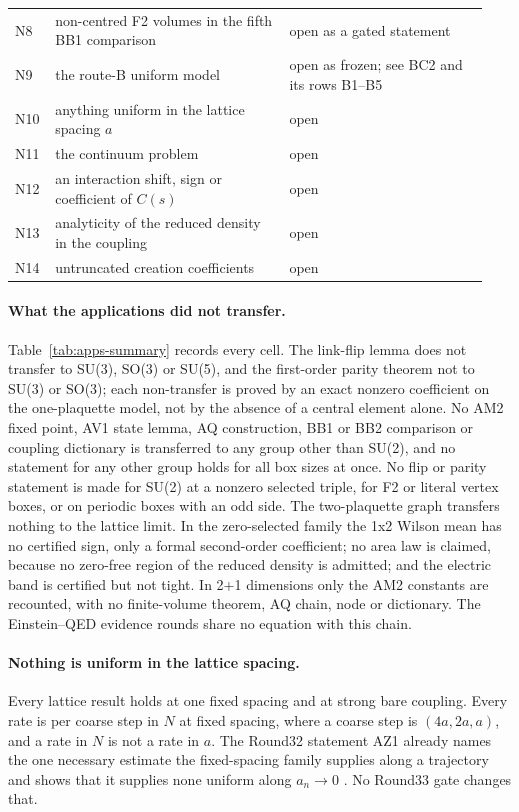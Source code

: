 \begin{longtable}{@{}>{\raggedright\arraybackslash}p{0.07\linewidth}
 >{\raggedright\arraybackslash}p{0.47\linewidth}
 >{\raggedright\arraybackslash}p{0.40\linewidth}@{}}
N8 & non-centred F2 volumes in the fifth BB1 comparison & open as a gated statement\\
N9 & the route-B uniform model & open as frozen; see BC2 and its rows B1--B5\\
N10 & anything uniform in the lattice spacing $a$ & open\\
N11 & the continuum problem & open\\
N12 & an interaction shift, sign or coefficient of $C(s)$ & open\\
N13 & analyticity of the reduced density in the coupling & open\\
N14 & untruncated creation coefficients & open\\
\end{longtable}
\endgroup

\paragraph{What the applications did not transfer.}
Table~\ref{tab:apps-summary} records every cell. The link-flip lemma does not
transfer to SU(3), SO(3) or SU(5), and the first-order parity theorem not to
SU(3) or SO(3); each non-transfer is proved by an exact nonzero coefficient on
the one-plaquette model, not by the absence of a central element alone. No
AM2 fixed point, AV1 state lemma, AQ construction, BB1 or BB2 comparison or
coupling dictionary is transferred to any group other than SU(2), and no
statement for any other group holds for all box sizes at once. No flip or
parity statement is made for SU(2) at a nonzero selected triple, for F2 or
literal vertex boxes, or on periodic boxes with an odd side. The
two-plaquette graph transfers nothing to the lattice limit. In the
zero-selected family the 1x2 Wilson mean has no certified sign, only a formal
second-order coefficient; no area law is claimed, because no zero-free region
of the reduced density is admitted; and the electric band is certified but
not tight. In 2+1 dimensions only the AM2 constants are recounted, with no
finite-volume theorem, AQ chain, node or dictionary. The Einstein--QED
evidence rounds share no equation with this chain.

\paragraph{Nothing is uniform in the lattice spacing.} Every lattice result
holds at one fixed spacing and at strong bare coupling. Every rate is per
coarse step in $N$ at fixed spacing, where a coarse step is $(4a,2a,a)$, and a
rate in $N$ is not a rate in $a$. The Round32 statement AZ1 already names the
one necessary estimate the fixed-spacing family supplies along a trajectory
and shows that it supplies none uniform along $a_n\to0$ \cite{r32add}. No
Round33 gate changes that.

